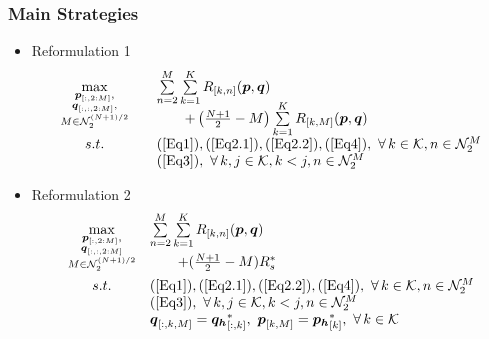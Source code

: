 \documentclass[handout,11.5pt]{beamer}
\begin{document}
\begin{frame}
\frametitle{Main Strategies}
	\begin{itemize}
		\item<1-> Reformulation 1
		\begin{equation}\label{reformulation1}
			\begin{array}{cll}
			\max\limits_{\substack{\boldsymbol{p}_{[:,2:M]}, \\ \boldsymbol{q}_{[:,:,2:M]}, \\ M\in\mathcal{N}_2^{(N+1)/2}}}\quad & \sum\limits_{n=2}^{M}\sum\limits_{k=1}^K R_{[k,n]}(\boldsymbol{p},\boldsymbol{q}) \\[-20pt] &\qquad+\left(\frac{N+1}{2}-M\right)\sum\limits_{k=1}^KR_{[k,M]}(\boldsymbol{p},\boldsymbol{q}) \\
			s.t. \quad & (\ref{Eq1}),(\ref{Eq2.1}),(\ref{Eq2.2}),(\ref{Eq4}),\ \forall\,k\in\mathcal{K},n\in\mathcal{N}_2^M \\
			& (\ref{Eq3}),\ \forall\,k,j\in\mathcal{K},k<j,n\in\mathcal{N}_2^M
			\end{array}
		\end{equation}
		\item<2-> Reformulation 2
		\begin{equation}\label{reformulation2}
			\begin{array}{cl}
			\max\limits_{\substack{\boldsymbol{p}_{[:,2:M]}, \\ \boldsymbol{q}_{[:,:,2:M]} \\ M\in\mathcal{N}_2^{(N+1)/2}
			}} & \sum\limits_{n=2}^{M}\sum\limits_{k=1}^K R_{[k,n]}(\boldsymbol{p},\boldsymbol{q}) \\[-13pt] &\qquad+(\frac{N+1}{2}-M)R_s^* \\[5pt]
			s.t.  & (\ref{Eq1}),(\ref{Eq2.1}),(\ref{Eq2.2}),(\ref{Eq4}),\ \forall\,k\in\mathcal{K},n\in\mathcal{N}_2^M \\
			& (\ref{Eq3}),\ \forall\,k,j\in\mathcal{K},k<j,n\in\mathcal{N}_2^M \\
			& \boldsymbol{q}_{[:,k,M]}=\boldsymbol{q_h}^*_{[:,k]},\   \boldsymbol{p}_{[k,M]} = \boldsymbol{p_h}^*_{[k]},\  \forall\,k\in\mathcal{K}
			\end{array}
		\end{equation}
	\end{itemize}
\end{frame}
\end{document}
